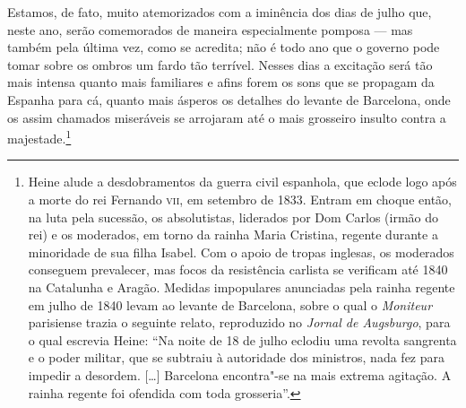  Estamos, de fato, muito atemorizados com a iminência dos dias de julho
que, neste ano, serão comemorados de maneira especialmente pomposa ---
mas também pela última vez, como se acredita; não é todo ano que o
governo pode tomar sobre os ombros um fardo tão terrível. Nesses dias a
excitação será tão mais intensa quanto mais familiares e afins forem os
sons que se propagam da Espanha para cá, quanto mais ásperos os
detalhes do levante de Barcelona, onde os assim chamados miseráveis se
arrojaram até o mais grosseiro insulto contra a majestade.\footnote{
Heine alude a desdobramentos da guerra civil espanhola, que eclode logo
após a morte do rei Fernando \textsc{vii}, em setembro de 1833. Entram em choque
então, na luta pela sucessão, os absolutistas, liderados por Dom Carlos
(irmão do rei) e os moderados, em torno da rainha Maria Cristina,
regente durante a minoridade de sua filha Isabel. Com o apoio de tropas
inglesas, os moderados conseguem prevalecer, mas focos da resistência
carlista se verificam até 1840 na Catalunha e Aragão. Medidas
impopulares anunciadas pela rainha regente em julho de 1840 levam ao
levante de Barcelona, sobre o qual o \textit{Moniteur} parisiense
trazia o seguinte relato, reproduzido no \textit{Jornal de Augsburgo},
para o qual escrevia Heine: “Na noite de 18 de julho eclodiu uma
revolta sangrenta e o poder militar, que se subtraiu à autoridade dos
ministros, nada fez para impedir a desordem. [\ldots] Barcelona
encontra"-se na mais extrema agitação. A rainha regente foi ofendida
com toda grosseria”.}

